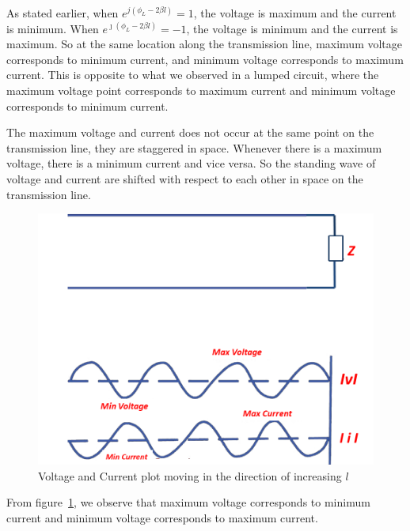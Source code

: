 As stated earlier, when $ e^{j(\phi_L - 2 \beta l)} = 1$, the voltage is maximum and the current is minimum. When $ e^{\jmath(\phi_L - 2 \beta l)} = -1$, the voltage is minimum and the current is maximum. So at the same location along the transmission line, maximum voltage corresponds to minimum current, and minimum voltage corresponds to maximum current. This is opposite to what we observed in a lumped circuit, where the maximum voltage point corresponds to maximum current and minimum voltage corresponds to minimum current.

The maximum voltage and current does not occur at the same point on the transmission line, they are staggered in space. Whenever there is a maximum voltage, there is a minimum current and vice versa. So the standing wave of voltage and current are shifted with respect to each other in space on the transmission line. 
\begin{figure}[h]
\centering
\includegraphics[width=0.7\linewidth]{./graphics/fig5.4modified}
\caption{Voltage and Current plot moving in the direction of increasing $l$}
\label{fig:asdfghjhgfdsa}
\end{figure}

From figure~\ref{fig:asdfghjhgfdsa}, we observe that maximum voltage corresponds to minimum current and minimum voltage corresponds to maximum current.


